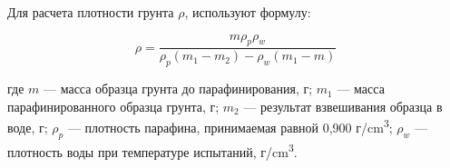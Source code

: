 Для расчета плотности грунта  $\rho$,  используют формулу: 

\[
   \rho = \frac{m \rho_p \rho_w}{\rho_p (m_1-m_2)-\rho_w (m_1-m)}
\]

где $m$ --- масса образца грунта до парафинирования, г;
$m_1$ --- масса парафинированного образца грунта, г;
$m_2$ --- результат взвешивания образца в воде, г; 
$\rho_p$ --- плотность парафина, принимаемая равной 0,900 г/\si{\centi\meter^3};
$\rho_w$ --- плотность воды при температуре испытаний,  г/\si{\centi\meter^3}.


%
%
%
%

